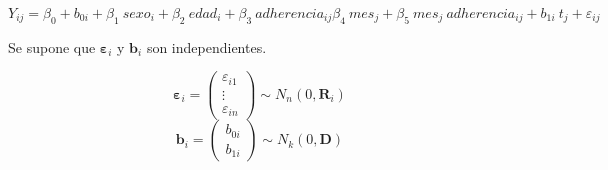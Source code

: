 \documentclass[spanish]{article}
\numberwithin{figure}{subsection}
\numberwithin{equation}{subsection}
\numberwithin{table}{subsection}
\begin{document}










\[
	Y_{ij} = \beta_0 + b_{0i} + \beta_1\ sexo_i + \beta_2\ edad_i + \beta_3\ adherencia_{ij}
	\beta_4\ mes_j + \beta_5\ mes_j\ adherencia_{ij} + b_{1i}\ t_j + \varepsilon_{ij}
\]

Se supone que $\bm{\varepsilon}_i$ y $\bm{b}_i$ son independientes.

\[ 
	\bm{\varepsilon}_i = \begin{pmatrix} \varepsilon_{i1} \\ \vdots \\ \varepsilon_{in} \end{pmatrix} \sim N_{n}(0, \bm{R}_i)
\]
\[
	\bm{b}_i = \begin{pmatrix} b_{0i} \\ b_{1i} \end{pmatrix} \sim N_k(0, \bm{D})
\]
\end{document}
